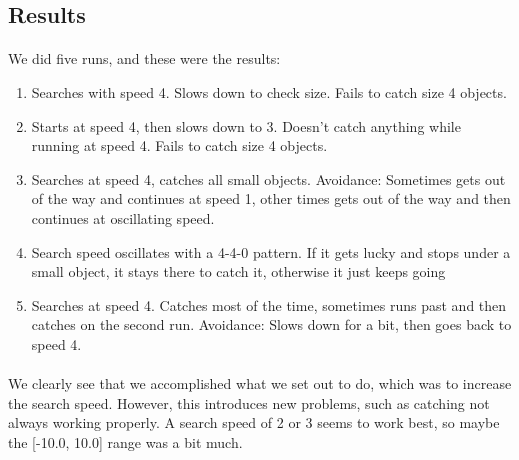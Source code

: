 \documentclass[a4paper,12pt]{article}
\begin{document}
\subsection{Results}
\paragraph{}We did five runs, and these were the results:
\begin{enumerate}
\item{Searches with speed 4. Slows down to check size. Fails to catch size 4 objects.}
\item{Starts at speed 4, then slows down to 3. Doesn't catch anything while running at speed 4. Fails to catch size 4 objects.}
\item{Searches at speed 4, catches all small objects. Avoidance: Sometimes gets out of the way and continues at speed 1, other times gets out of the way and then continues at oscillating speed.}
\item{Search speed oscillates with a 4-4-0 pattern. If it gets lucky and stops under a small object, it stays there to catch it, otherwise it just keeps going}
\item{Searches at speed 4. Catches most of the time, sometimes runs past and then catches on the second run. Avoidance: Slows down for a bit, then goes back to speed 4.}
\end{enumerate}
\paragraph{}We clearly see that we accomplished what we set out to do, which was to increase the search speed. However, this introduces new problems, such as catching not always working properly. A search speed of 2 or 3 seems to work best, so maybe the [-10.0, 10.0] range was a bit much.
\end{document}
